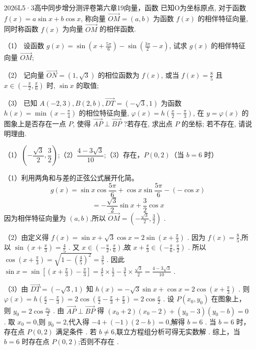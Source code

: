 
\begin{problem}{2026}{L}{5·3高中同步增分测评卷第六章}{19}{向量，函数}
已知O为坐标原点, 对于函数 $f(x)=a \sin x+b \cos x$, 称向量 $\overrightarrow{O M}=(a, b)$ 为函数 $f(x)$ 的相伴特征向量, 同时称函数 $f(x)$ 为向量 $\overrightarrow{O M}$ 的相伴函数.

（1） 设函数 $g(x)=\sin \left(x+\frac{5 \pi}{6}\right)-\sin \left(\frac{3 \pi}{2}-x\right)$, 试求 $g(x)$ 的相伴特征向量 $\overrightarrow{O M}$;

（2） 记向量 $\overrightarrow{O N}=(1, \sqrt{3})$ 的相位函数为 $f(x)$, 或当 $f(x)=\frac{8}{5}$ 且 $x \in\left(-\frac{\pi}{2}, \frac{\pi}{6}\right)$ 时, $\sin x$ 的取值;

（3） 已知 $A(-2,3), B(2, b), \overrightarrow{D T}=(-\sqrt{3}, 1)$ 为函数 $h(x)=\min \left(x-\frac{\pi}{4}\right)$ 的相位特征向量, $\varphi(x)=h\left(\frac{x}{2}-\frac{\pi}{3}\right)$, 在 $y=\varphi(x)$ 的图象上是否存在一点 $P$, 使得 $\overrightarrow{A P} \perp \overrightarrow{B P}$ ?若存在, 求出点 $P$ 的坐标; 若不存在, 请说明理由.

\end{problem}

\begin{answer}
（1）$\boxed{\left(-\dfrac{\sqrt{3}}{2}, \dfrac{3}{2}\right)}$;（2）$\boxed{\dfrac{4-3\sqrt{3}}{10}}$;（3）存在，$\boxed{P(0,2)}$（当 $b=6$ 时）
\end{answer}

\begin{solutions}
（1）利用两角和与差的正弦公式展开化简。
$$
g(x)=\sin x\cos\frac{5\pi}{6}+\cos x\sin\frac{5\pi}{6}-(-\cos x)
$$
$$
=-\frac{\sqrt{3}}{2}\sin x+\frac{3}{2}\cos x
$$
因为相伴特征向量为 $(a,b)$,所以 $\overrightarrow{OM}=\left(-\frac{\sqrt{3}}{2}, \frac{3}{2}\right)$ .

（2）由定义得 $f(x)=\sin x+\sqrt{3}\cos x=2\sin\left(x+\frac{\pi}{3}\right)$ .
因为 $f(x)=\frac{8}{5}$,所以 $\sin\left(x+\frac{\pi}{3}\right)=\frac{4}{5}$ .
又 $x\in\left(-\frac{\pi}{2}, \frac{\pi}{6}\right)$,故 $x+\frac{\pi}{3}\in\left(-\frac{\pi}{6}, \frac{\pi}{2}\right)$ .
所以 $\cos\left(x+\frac{\pi}{3}\right)=\sqrt{1-\left(\frac{4}{5}\right)^2}=\frac{3}{5}$ .
因此 $\sin x=\sin\left[\left(x+\frac{\pi}{3}\right)-\frac{\pi}{3}\right]=\frac{4}{5}\times\frac{1}{2}-\frac{3}{5}\times\frac{\sqrt{3}}{2}=\frac{4-3\sqrt{3}}{10}$ .

（3）由 $\overrightarrow{DT}=(-\sqrt{3},1)$ 知 $h(x)=-\sqrt{3}\sin x+\cos x=2\cos\left(x+\frac{\pi}{3}\right)$ .
则 $\varphi(x)=h\left(\frac{x}{2}-\frac{\pi}{3}\right)=2\cos\left(\frac{x}{2}-\frac{\pi}{3}+\frac{\pi}{3}\right)=2\cos\frac{x}{2}$ .
设 $P(x_0,y_0)$ 在图象上，则 $y_0=2\cos\frac{x_0}{2}$ .
由 $\overrightarrow{AP}\perp\overrightarrow{BP}$ 得 $(x_0+2)(x_0-2)+(y_0-3)(y_0-b)=0$ .
取 $x_0=0$,则 $y_0=2$,代入得 $-4+(-1)(2-b)=0$,解得 $b=6$ .
当 $b=6$ 时，存在点 $P(0,2)$ 满足条件 .
若 $b\neq 6$,联立方程组分析可得无实数解 .
综上，当 $b=6$ 时存在点 $P(0,2)$;否则不存在 .
\end{solutions}